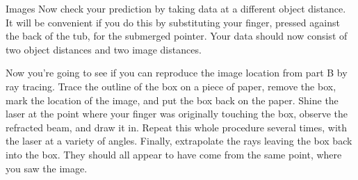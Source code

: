 \begin{lab}[0]{Images}
Now check your prediction by taking data at a different object distance.
It will be convenient if you do this by
substituting your finger, pressed against the back of the tub, for the submerged
pointer. Your data should now consist of two object distances and two image
distances.

Now you're going to see if you can reproduce the image location from
part B by ray tracing.
Trace the outline of the box on a piece of paper,
remove the box, mark the location of the image, and put
the box back on the paper. Shine the laser at the point
where your finger was originally touching the box, observe
the refracted beam, and draw it in. Repeat this whole
procedure several times, with the laser at a variety of
angles. Finally, extrapolate the rays leaving the box back
into the box. They should all appear to have come from the
same point, where you saw the image.



\vfill

\end{lab}


